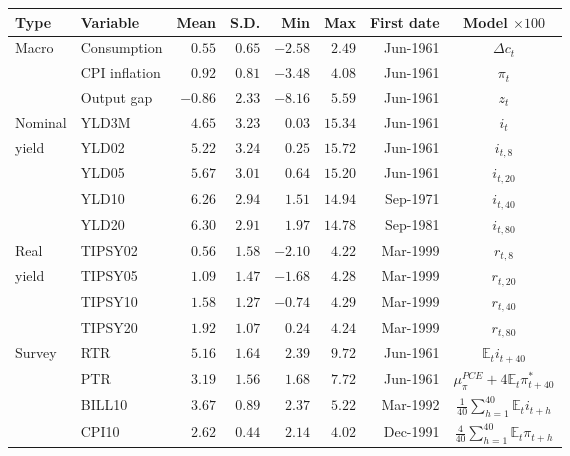 \begin{tabular}{llrrrrrc} \hline Type & Variable & Mean & S.D. & Min & Max & First date & Model $\times 100$ \\ \hline Macro & Consumption & $0.55$ & $0.65$ & $-2.58$ & $2.49$ & Jun-1961 & $\Delta c_t$ \\  & CPI inflation & $0.92$ & $0.81$ & $-3.48$ & $4.08$ & Jun-1961 & $\pi_t$ \\  & Output gap & $-0.86$ & $2.33$ & $-8.16$ & $5.59$ & Jun-1961 & $z_t$ \\ Nominal & YLD3M & $4.65$ & $3.23$ & $0.03$ & $15.34$ & Jun-1961 & $i_t$ \\ yield & YLD02 & $5.22$ & $3.24$ & $0.25$ & $15.72$ & Jun-1961 & $i_{t,8}$ \\  & YLD05 & $5.67$ & $3.01$ & $0.64$ & $15.20$ & Jun-1961 & $i_{t,20}$ \\  & YLD10 & $6.26$ & $2.94$ & $1.51$ & $14.94$ & Sep-1971 & $i_{t,40}$ \\  & YLD20 & $6.30$ & $2.91$ & $1.97$ & $14.78$ & Sep-1981 & $i_{t,80}$ \\ Real & TIPSY02 & $0.56$ & $1.58$ & $-2.10$ & $4.22$ & Mar-1999 & $r_{t,8}$ \\ yield & TIPSY05 & $1.09$ & $1.47$ & $-1.68$ & $4.28$ & Mar-1999 & $r_{t,20}$ \\  & TIPSY10 & $1.58$ & $1.27$ & $-0.74$ & $4.29$ & Mar-1999 & $r_{t,40}$ \\  & TIPSY20 & $1.92$ & $1.07$ & $0.24$ & $4.24$ & Mar-1999 & $r_{t,80}$ \\ Survey & RTR & $5.16$ & $1.64$ & $2.39$ & $9.72$ & Jun-1961 & $\mathbb{E}_t i_{t+40}$ \\  & PTR & $3.19$ & $1.56$ & $1.68$ & $7.72$ & Jun-1961 & $\mu_\pi^{PCE} + 4\mathbb{E}_t \pi_{t+40}^*$ \\  & BILL10 & $3.67$ & $0.89$ & $2.37$ & $5.22$ & Mar-1992 & $\frac{1}{40}\sum_{h=1}^{40}\mathbb{E}_t i_{t+h}$ \\  & CPI10 & $2.62$ & $0.44$ & $2.14$ & $4.02$ & Dec-1991 & $\frac{4}{40}\sum_{h=1}^{40}\mathbb{E}_t \pi_{t+h}$ \\ \hline \end{tabular}
